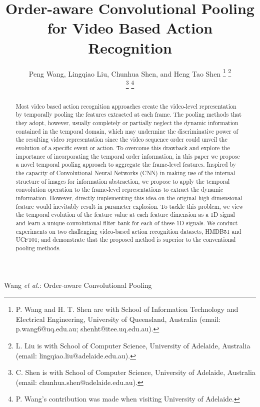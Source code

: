 \documentclass[journal]{IEEEtran}
\begin{document}
%
%
%
%
%
%
%
\title{Order-aware Convolutional Pooling for Video Based Action Recognition}
%
%
%
%
%
%
%
%
%
%

\author{Peng Wang,
		Lingqiao Liu,
        Chunhua Shen,
        and Heng Tao Shen%
\thanks{P. Wang and H. T. Shen are with School of Information Technology and Electrical Engineering,  University of Queensland, Australia (email: p.wang6@uq.edu.au;
shenht@itee.uq.edu.au).}%
\thanks{L. Liu is with School of Computer Science, University of Adelaide, Australia (email: lingqiao.liu@adelaide.edu.au).}

\thanks{C. Shen is with School of Computer Science, University of Adelaide, Australia (email: chunhua.shen@adelaide.edu.au).}
\thanks{P. Wang's contribution was made when visiting University of Adelaide.}%
}







%
%
{Wang \MakeLowercase{\textit{et al.}}: Order-aware Convolutional Pooling}
%
%
%
%
%
%
%




%
%
%
%
%



%
%





%
\maketitle

%
%
\begin{abstract}


Most video based action recognition approaches create the video-level representation by temporally pooling the features extracted at each frame. The pooling methods that they adopt, however, usually completely or partially neglect the dynamic information contained in the temporal domain, which may undermine the discriminative power of the resulting video representation since the video sequence order could unveil the evolution of a specific event or action. To overcome this drawback and explore the importance of incorporating the temporal order information, in this paper we propose a novel temporal pooling approach to aggregate the frame-level features. Inspired by the capacity of Convolutional Neural Networks (CNN) in making use of the internal structure of images for information abstraction, we propose to apply the temporal convolution operation to the frame-level representations to extract the dynamic information. However, directly implementing this idea on the original high-dimensional feature would inevitably result in parameter explosion.
	To tackle this problem, we view the temporal evolution of the feature value at each feature dimension as a 1D signal and learn a unique convolutional filter bank for each of these 1D signals.  We conduct experiments on two challenging video-based action recognition datasets, HMDB51 and UCF101; and  demonstrate that the proposed method is superior to the conventional pooling methods.

%
%
%
%


\end{abstract}
\end{document}
